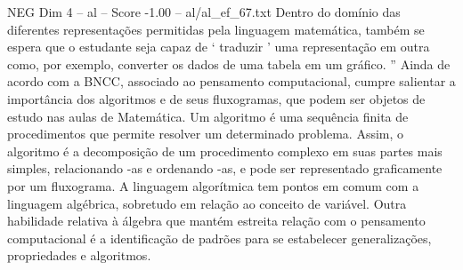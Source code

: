 \begin{textsample}{NEG Dim 4 – al – Score -1.00 – al/al\_ef\_67.txt}
Dentro do domínio das diferentes representações permitidas pela linguagem matemática, também se espera que o estudante seja capaz de ‘ traduzir ’ uma representação em outra como, por exemplo, converter os dados de uma tabela em um gráfico. ” Ainda de acordo com a BNCC, associado ao pensamento computacional, cumpre salientar a importância dos algoritmos e de seus fluxogramas, que podem ser objetos de estudo nas aulas de Matemática.
Um algoritmo é uma sequência finita de procedimentos que permite resolver um determinado problema.
Assim, o algoritmo é a decomposição de um procedimento complexo em suas partes mais simples, relacionando -as e ordenando -as, e pode ser representado graficamente por um fluxograma.
A linguagem algorítmica tem pontos em comum com a linguagem algébrica, sobretudo em relação ao conceito de variável.
Outra habilidade relativa à álgebra que mantém estreita relação com o pensamento computacional é a identificação de padrões para se estabelecer generalizações, propriedades e algoritmos.

\end{textsample}
